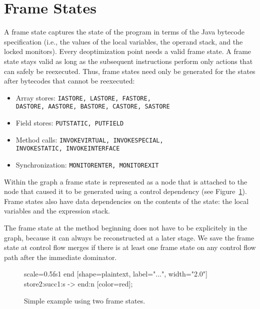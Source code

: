 \documentclass[twocolumn]{svjour3}
\begin{document}
\section{Frame States}
A frame state captures the state of the program in terms of the Java bytecode specification (i.e., the values of the local variables, the operand stack, and the locked monitors).
Every deoptimization point needs a valid frame state.
A frame state stays valid as long as the subsequent instructions perform only actions that can safely be reexecuted.
Thus, frame states need only be generated for the states after bytecodes that cannot be reexecuted:

\begin{itemize}
    \item Array stores: {\tt IASTORE, LASTORE, FASTORE, \\DASTORE, AASTORE, BASTORE, CASTORE, SASTORE}
    \item Field stores: {\tt PUTSTATIC, PUTFIELD}
    \item Method calls: {\tt INVOKEVIRTUAL, INVOKESPECIAL, \\INVOKESTATIC, INVOKEINTERFACE}
    \item Synchronization: {\tt MONITORENTER, MONITOREXIT}
\end{itemize}

Within the graph a frame state is represented as a node that is attached to the node that caused it to be generated using a control dependency (see Figure~\ref{fig:fs1}).
Frame states also have data dependencies on the contents of the state: the local variables and the expression stack.

The frame state at the method beginning does not have to be explicitely in the graph, because it can always be reconstructed at a later stage.
We save the frame state at control flow merges if there is at least one frame state on any control flow path after the immediate dominator.


\begin{figure}[h]
  \centering
\begin{digraphenv}{scale=0.5}{fs1}
    end [shape=plaintext, label="...", width="2.0"]
    store2:succ1:s -> end:n [color=red];
\end{digraphenv}
  \caption{Simple example using two frame states.}
  \label{fig:fs1}
\end{figure}
\end{document}
